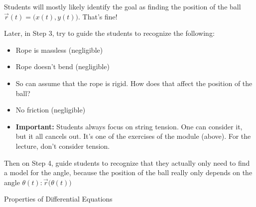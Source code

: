 \begin{annotation}
	\begin{goals}
		Students will mostly likely identify the goal as finding the position of the ball $\vec{r}(t) = \big( x(t) , y(t) \big)$. That's fine!
		
		Later, in Step 3, try to guide the students to recognize the following:
		\begin{itemize}
			\item Rope is massless (negligible)
			\item Rope doesn't bend (negligible)
			\item So can assume that the rope is rigid. How does that affect the position of the ball?
			\item No friction (negligible)
			\item \textbf{Important:} Students always focus on string tension. One can consider it, but it all cancels out. It's one of the exercises of the module (above). For the lecture, don't consider tension.
		\end{itemize}
		
		Then on Step 4, guide students to recognize that they actually only need to find a model for the angle, because the position of the ball really only depends on the angle $\theta(t): \vec{r}\big(\theta(t)\big)$
				
	\end{goals}
\end{annotation}






%
%

\standardonlynewpage





\begin{module}{Properties of Differential Equations}
	\label{ODE:properties}

	
	






\end{module}



